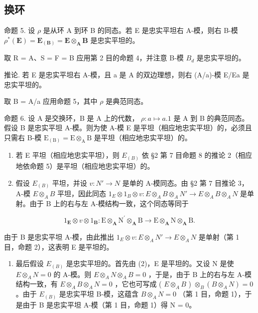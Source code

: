 \subsection{换环}

命题 5. 设 \(\rho\) 是从环 A 到环 B 的同态。若 E 是忠实平坦右 A-模，则右 B-模 \(\rho^{*}(\mathbf{E}) = \mathbf{E}_{(\mathbf{B})} = \mathbf{E} \otimes_{\mathbf{A}} \mathbf{B}\) 是忠实平坦的。

取 R = A、S = F = B 应用第 2 目的命题 4，并注意 B-模 \(B_{d}\) 是忠实平坦的。

推论. 若 E 是忠实平坦右 A-模，且 a 是 A 的双边理想，则右 (A/a)-模 E/Ea 是忠实平坦的。

取 B = A/a 应用命题 5，其中 \(\rho\) 是典范同态。

命题 6. 设 A 是交换环，B 是 A 上的代数， \(\rho: a \mapsto a . 1\) 是 A 到 B 的典范同态。假设 B 是忠实平坦 A-模。则为使 A-模 E 是平坦（相应地忠实平坦）的，必须且只需右 B-模 \(\mathrm{E}_{(\mathrm{B})} = \mathrm{E} \otimes_{\mathrm{A}} \mathrm{B}\) 是平坦（相应地忠实平坦）的。

\begin{enumerate}
\def\labelenumi{(\arabic{enumi})}
\item
  若 E 平坦（相应地忠实平坦），则 \(E_{(B)}\) 依 §2 第 7 目命题 8 的推论 2（相应地依命题 5）是平坦（相应地忠实平坦）的。
\item
  假设 \(E_{(B)}\) 平坦，并设 \(v: N' \to N\) 是单的 A-模同态。由 §2 第 7 目推论 3，A-模 \(E \otimes_{A} B\) 平坦，因此同态 \(1_{E} \otimes 1_{B} \otimes v: E \otimes_{A} B \otimes_{A} N' \to E \otimes_{A} B \otimes_{A} N\) 是单射。由于 B 上的右与左 A-模结构一致，这个同态等同于
\end{enumerate}

\[
\mathrm{1} _ {\mathbf {E}} \otimes v \otimes \mathrm{1} _ {\mathbf {B}}: \mathrm{E} \otimes_ {\mathbf {A}} \mathrm{N} ^ {\prime} \otimes_ {\mathbf {A}} \mathrm{B} \rightarrow \mathrm{E} \otimes_ {\mathbf {A}} \mathrm{N} \otimes_ {\mathbf {A}} \mathrm{B}.
\]

由于 B 是忠实平坦 A-模，由此推出 \(1_{E} \otimes v: E \otimes_{A} N' \to E \otimes_{A} N\) 是单射（第 1 目，命题 2），这表明 E 是平坦的。

\begin{enumerate}
\def\labelenumi{(\arabic{enumi})}
\setcounter{enumi}{2}
\tightlist
\item
  最后假设 \(E_{(B)}\) 是忠实平坦的。首先由 (2)，E 是平坦的。又设 N 是使 \(E \otimes_{A} N = 0\) 的 A-模。则 \(E \otimes_{A} N \otimes_{A} B = 0\) ，于是，由于 B 上的右与左 A-模结构一致，有 \(E \otimes_{A} B \otimes_{A} N = 0\) ，它也可写成 ( \(E \otimes_{A} B\) ) \(\otimes_{B} (B \otimes_{A} N) = 0\) 。由于 \(E_{(B)}\) 是忠实平坦 B-模，这蕴含 \(B \otimes_{A} N = 0\) （第 1 目，命题 1），于是由于 B 是忠实平坦 A-模（第 1 目，命题 1）得 N = 0。
\end{enumerate}

